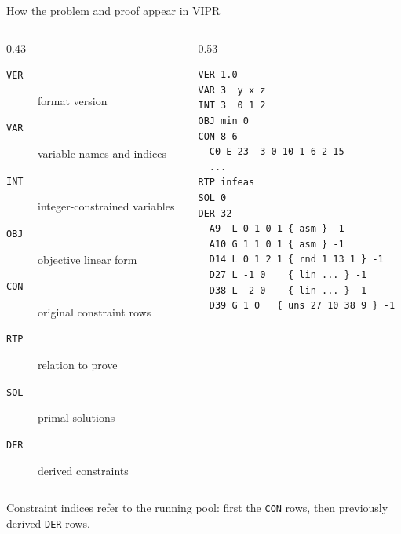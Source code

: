 \documentclass[aspectratio=169,11pt]{beamer}
\newcommand{\code}[1]{\texttt{#1}}
\begin{document}
\begin{frame}[fragile]{How the problem and proof appear in VIPR}
  \begin{columns}[T]
    \begin{column}{0.43\textwidth}
      \begin{description}
        \item[\code{VER}] format version
        \item[\code{VAR}] variable names and indices
        \item[\code{INT}] integer-constrained variables
        \item[\code{OBJ}] objective linear form
        \item[\code{CON}] original constraint rows
        \item[\code{RTP}] relation to prove
        \item[\code{SOL}] primal solutions
        \item[\code{DER}] derived constraints
      \end{description}
    \end{column}
    \begin{column}{0.53\textwidth}
\begin{lstlisting}
VER 1.0
VAR 3  y x z
INT 3  0 1 2
OBJ min 0
CON 8 6
  C0 E 23  3 0 10 1 6 2 15
  ...
RTP infeas
SOL 0
DER 32
  A9  L 0 1 0 1 { asm } -1
  A10 G 1 1 0 1 { asm } -1
  D14 L 0 1 2 1 { rnd 1 13 1 } -1
  D27 L -1 0    { lin ... } -1
  D38 L -2 0    { lin ... } -1
  D39 G 1 0   { uns 27 10 38 9 } -1
\end{lstlisting}
    \end{column}
  \end{columns}

  \vspace{0.3em}
  Constraint indices refer to the running pool: first the \code{CON} rows, then
  previously derived \code{DER} rows.
\end{frame}
\end{document}
